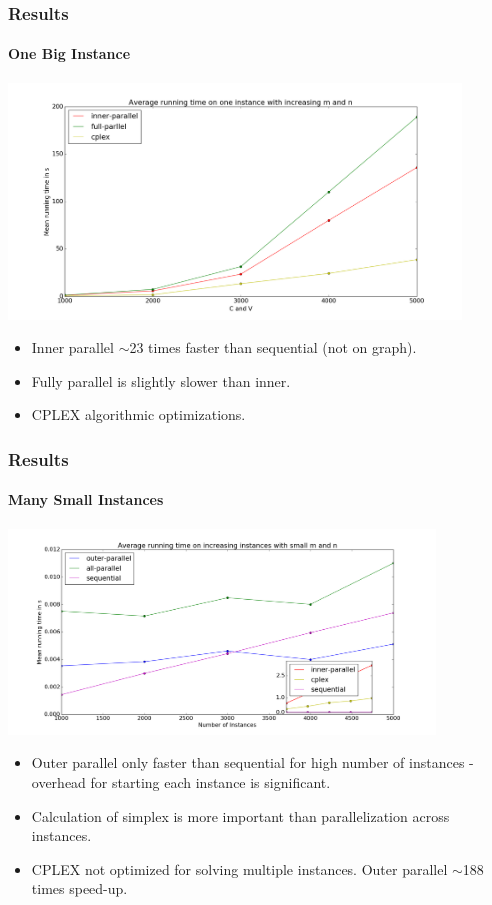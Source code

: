 \documentclass{beamer}
\begin{document}
\begin{frame}[fragile]
\frametitle{Results}
\framesubtitle{One Big Instance}
\centering
\includegraphics[width=0.9\textwidth]{../Doc/figures/one-big-new}
\begin{itemize}
	\item Inner parallel $\sim$23 times faster than sequential (not on graph).
	\item Fully parallel is slightly slower than inner.
	\item CPLEX algorithmic optimizations.
\end{itemize}
\end{frame}

\begin{frame}[fragile]
\frametitle{Results}
\framesubtitle{Many Small Instances}
\centering
\includegraphics[width=0.85\textwidth]{../Doc/figures/many-small-in-one}
\begin{itemize}
	\item Outer parallel only faster than sequential for high number of instances - overhead for starting each instance is significant.
	\item Calculation of simplex is more important than parallelization across instances.
	\item CPLEX not optimized for solving multiple instances. Outer parallel $\sim$188 times speed-up.
\end{itemize}
\end{frame}
\end{document}
